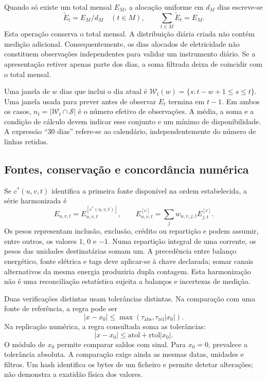 Quando só existe um total mensal $E_M$, a alocação uniforme em $d_M$ dias escreve-se
\begin{equation}
\widetilde E_t=E_M/d_M\quad(t\in M),
\qquad \sum_{t\in M}\widetilde E_t=E_M.
\label{eq:mat-alocacao-mensal}
\end{equation}
Esta operação conserva o total mensal. A distribuição diária criada não contém medição adicional. Consequentemente, os dias alocados de eletricidade não constituem observações independentes para validar um instrumento diário. Se a apresentação retiver apenas parte dos dias, a soma filtrada deixa de coincidir com o total mensal.

Uma janela de $w$ dias que inclui o dia atual é $\mathcal W_t(w)=\{s:t-w+1\leq s\leq t\}$. Uma janela usada para prever antes de observar $E_t$ termina em $t-1$. Em ambos os casos, $n_t=|\mathcal W_t\cap\mathcal S|$ é o número efetivo de observações. A média, a soma e a condição de cálculo devem indicar esse conjunto e um mínimo de disponibilidade. A expressão ``30 dias'' refere-se ao calendário, independentemente do número de linhas retidas.

\subsection{Fontes, conservação e concordância numérica}
\label{sec:mat-concordancia}
Se $c^*(u,v,t)$ identifica a primeira fonte disponível na ordem estabelecida, a série harmonizada é
\begin{equation}
E_{u,v,t}=E^{[c^*(u,v,t)]}_{u,v,t},
\qquad E^{[c]}_{u,v,t}=\sum_j w_{u,v,j,t}E^{[c]}_{j,t}.
\label{eq:mat-fontes}
\end{equation}
Os pesos representam inclusão, exclusão, crédito ou repartição e podem assumir, entre outros, os valores $1$, $0$ e $-1$. Numa repartição integral de uma corrente, os pesos das unidades destinatárias somam um. A precedência entre balanço energético, fonte elétrica e tags deve aplicar-se à chave declarada; somar canais alternativos da mesma energia produziria dupla contagem. Esta harmonização não é uma reconciliação estatística sujeita a balanços e incertezas de medição.

Duas verificações distintas usam tolerâncias distintas. Na comparação com uma fonte de referência, a regra pode ser
\begin{equation}
|x-x_0|\leq\max(\tau_{\mathrm{abs}},\tau_{\mathrm{rel}}|x_0|).
\label{eq:mat-tolerancia-dados}
\end{equation}
Na replicação numérica, a regra consultada soma as tolerâncias:
\begin{equation}
|x-x_0|\leq\mathrm{atol}+\mathrm{rtol}|x_0|.
\label{eq:mat-tolerancia-replica}
\end{equation}
O módulo de $x_0$ permite comparar saldos com sinal. Para $x_0=0$, prevalece a tolerância absoluta. A comparação exige ainda as mesmas datas, unidades e filtros. Um hash identifica os bytes de um ficheiro e permite detetar alterações; não demonstra a exatidão física dos valores.

